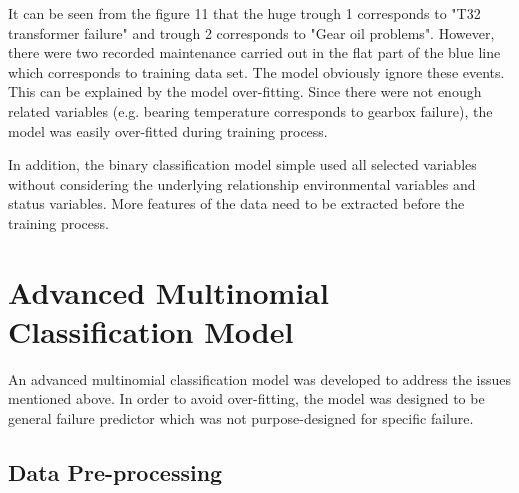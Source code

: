 It can be seen from the figure 11 that the huge trough 1 corresponds to "T32 transformer failure" and trough 2 corresponds to "Gear oil problems". However, there were two recorded maintenance carried out in the flat part of the blue line which corresponds to training data set. The model obviously ignore these events. This can be explained by the model over-fitting. Since there were not enough related variables (e.g. bearing temperature corresponds to gearbox failure), the model was easily over-fitted during training process.

In addition, the binary classification model simple used all selected variables without considering the underlying relationship environmental variables and status variables. More features of the data need to be extracted before the training process. 

\section{Advanced Multinomial Classification Model}
An advanced multinomial classification model was developed to address the issues mentioned above. In order to avoid over-fitting, the model was designed to be general failure predictor which was not purpose-designed for specific failure.

\subsection{Data Pre-processing}

